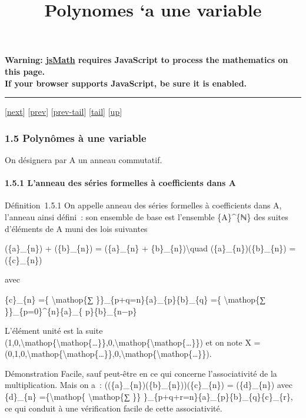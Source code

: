 \documentclass[]{article}
\title{Polynomes `a une variable}
\author{}
\date{}
\begin{document}
\maketitle

\textbf{Warning: \href{http://www.math.union.edu/locate/jsMath}{jsMath}
requires JavaScript to process the mathematics on this page.\\ If your
browser supports JavaScript, be sure it is enabled.}

\begin{center}\rule{3in}{0.4pt}\end{center}

{[}\href{coursse6.html}{next}{]} {[}\href{coursse4.html}{prev}{]}
{[}\href{coursse4.html\#tailcoursse4.html}{prev-tail}{]}
{[}\hyperref[tailcoursse5.html]{tail}{]}
{[}\href{coursch2.html\#coursse5.html}{up}{]}

\subsubsection{1.5 Polynômes à une variable}

On désignera par A un anneau commutatif.

\paragraph{1.5.1 L'anneau des séries formelles à coefficients dans A}

Définition~1.5.1 On appelle anneau des séries formelles à coefficients
dans A, l'anneau ainsi défini~: son ensemble de base est l'ensemble
\{A\}\^{}\{ℕ\} des suites d'éléments de A muni des lois suivantes

(\{a\}\_\{n\}) + (\{b\}\_\{n\}) = (\{a\}\_\{n\} +
\{b\}\_\{n\})\textbackslash{}quad (\{a\}\_\{n\})(\{b\}\_\{n\}) =
(\{c\}\_\{n\})

avec

\{c\}\_\{n\} =\{ \textbackslash{}mathop\{∑
\}\}\_\{p+q=n\}\{a\}\_\{p\}\{b\}\_\{q\} =\{ \textbackslash{}mathop\{∑
\}\}\_\{p=0\}\^{}\{n\}\{a\}\_\{ p\}\{b\}\_\{n−p\}

L'élément unité est la suite
(1,0,\textbackslash{}mathop\{\textbackslash{}mathop\{\ldots{}\}\},0,\textbackslash{}mathop\{\textbackslash{}mathop\{\ldots{}\}\})
et on note X =
(0,1,0,\textbackslash{}mathop\{\textbackslash{}mathop\{\ldots{}\}\},0,\textbackslash{}mathop\{\textbackslash{}mathop\{\ldots{}\}\}).

Démonstration Facile, sauf peut-être en ce qui concerne l'associativité
de la multiplication. Mais on a~:
((\{a\}\_\{n\})(\{b\}\_\{n\}))(\{c\}\_\{n\}) = (\{d\}\_\{n\}) avec
\{d\}\_\{n\} =\{\textbackslash{}mathop\{ \textbackslash{}mathop\{∑ \}\}
\}\_\{p+q+r=n\}\{a\}\_\{p\}\{b\}\_\{q\}\{c\}\_\{r\}, ce qui conduit à
une vérification facile de cette associativité.
\end{document}
